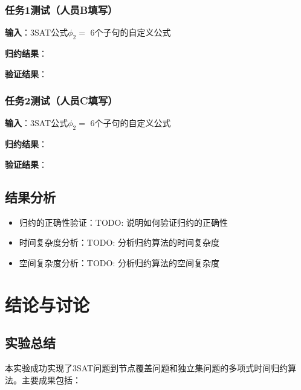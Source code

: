 \documentclass{sysucseexp}
\begin{document}
\subsubsection{任务1测试（人员B填写）}

\textbf{输入}：3SAT公式$\phi_2 = $ 6个子句的自定义公式

\textbf{归约结果}：

\textbf{验证结果}：

\subsubsection{任务2测试（人员C填写）}

\textbf{输入}：3SAT公式$\phi_2 = $ 6个子句的自定义公式

\textbf{归约结果}：

\textbf{验证结果}：

\subsection{结果分析}

\begin{itemize}
    \item 归约的正确性验证：TODO: 说明如何验证归约的正确性
    \item 时间复杂度分析：TODO: 分析归约算法的时间复杂度
    \item 空间复杂度分析：TODO: 分析归约算法的空间复杂度
\end{itemize}


\section{结论与讨论}

\subsection{实验总结}

本实验成功实现了3SAT问题到节点覆盖问题和独立集问题的多项式时间归约算法。主要成果包括：
\end{document}
